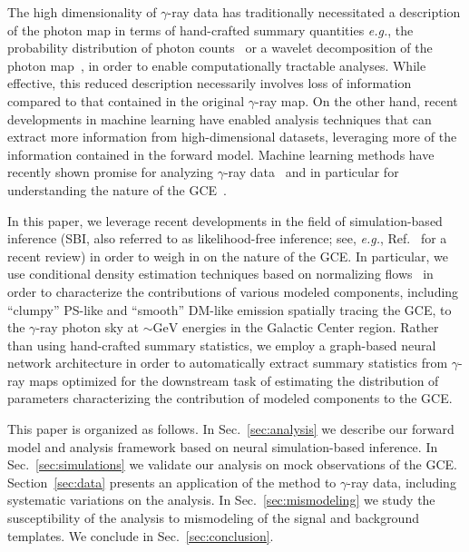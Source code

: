 \documentclass[prd,aps,10pt,nofootinbib,twocolumn,superscriptaddress,preprintnumbers,balancelastpage,longbibliography]{revtex4-1}
\begin{document}
The high dimensionality of $\gamma$-ray data has traditionally necessitated a description of the photon map in terms of hand-crafted summary quantities \emph{e.g.}, the probability distribution of photon counts~\cite{Lee:2014mza,Lee:2015fea} or a wavelet decomposition of the photon map~\cite{Bartels:2015aea,Balaji:2018rwz,McDermott:2015ydv}, in order to enable computationally tractable analyses. While effective, this reduced description necessarily involves loss of information compared to that contained in the original $\gamma$-ray map. On the other hand, recent developments in machine learning have enabled analysis techniques that can extract more information from high-dimensional datasets, leveraging more of the information contained in the forward model. Machine learning methods have recently shown promise for analyzing $\gamma$-ray data~\cite{Caron:2021map} and in particular for understanding the nature of the \Fermi GCE~\cite{List:2020mzd,Caron:2017udl}. 

In this paper, we leverage recent developments in the field of simulation-based inference (SBI, also referred to as likelihood-free inference; see, \emph{e.g.}, Ref.~\cite{cranmer2020frontier} for a recent review)
in order to weigh in on the nature of the GCE. In particular, we use conditional density estimation techniques based on normalizing flows~\cite{papamakarios2019normalizing,rezende2015variational} in order to characterize the contributions of various modeled components, including ``clumpy'' PS-like and ``smooth'' DM-like emission spatially tracing the GCE, to the $\gamma$-ray photon sky at $\sim\mathrm{GeV}$ energies in the Galactic Center region. Rather than using hand-crafted summary statistics, we employ a graph-based neural network architecture in order to automatically extract summary statistics from $\gamma$-ray maps optimized for the downstream task of estimating the distribution of parameters characterizing the contribution of modeled components to the GCE.

This paper is organized as follows. In Sec.~\ref{sec:analysis} we describe our forward model and analysis framework based on neural simulation-based inference. In Sec.~\ref{sec:simulations} we validate our analysis on mock observations of the \Fermi GCE. Section~\ref{sec:data} presents an application of the method to \Fermi $\gamma$-ray data, including systematic variations on the analysis. In Sec.~\ref{sec:mismodeling} we study the susceptibility of the analysis to mismodeling of the signal and background templates. We conclude in Sec.~\ref{sec:conclusion}.
\end{document}

